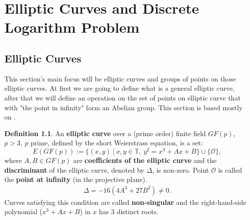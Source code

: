 \documentclass[thesis=M,english]{FITthesis}[2012/10/20]
\theoremstyle{remark}
\theoremstyle{definition}
\newtheorem{DF}{Definition}[section]
\begin{document}
%
%
\chapter{Elliptic Curves and Discrete Logarithm Problem}
\section{Elliptic Curves}
This section's main focus will be elliptic curves and groups of points on those elliptic curves. At first we are going to define what is a general elliptic curve, after that we will define an operation on the set of points on elliptic curve that with "the point in infinity" form an Abelian group. This section is based mostly on \cite{mky}.
\begin{DF}
An \textbf{elliptic curve} over a (prime order) finite field $GF(p),$ \\ $p > 3,\ p$ prime, defined by the short Weierstrass equation, is a set:
$$
E(GF(p)) := \{(x,y)\ |\ x,y \in \mathbb{T},\ y^2 = x^3 + Ax+B\} \cup \{ \mathcal{O} \},
$$
where $A, B \in GF(p)$ are \textbf{coefficients of the elliptic curve} and the \textbf{discriminant} of the elliptic curve, denoted by $\Delta$, is non-zero. Point $\mathcal{O}$ is called the \textbf{point at infinity} (in the projective plane).
\begin{align*}
\Delta = -16(4A^3 + 27B^2) \neq 0.
\end{align*}
Curves satisfying this condition are called \textbf{non-singular} and the right-hand-side polynomial ($x^3 + Ax+B$) in $x$ has 3 distinct roots. 
\end{DF}
\end{document}
